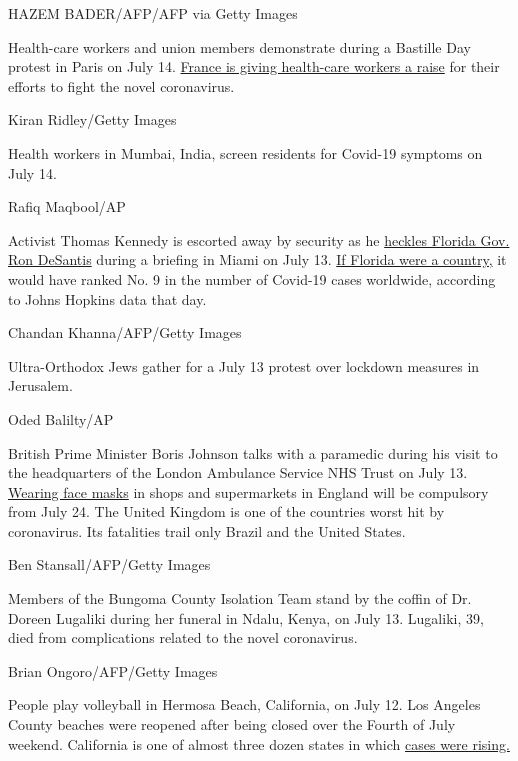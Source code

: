 HAZEM BADER/AFP/AFP via Getty Images

Health-care workers and union members demonstrate during a Bastille Day
protest in Paris on July 14.
\href{https://www.npr.org/sections/coronavirus-live-updates/2020/07/14/890721869/french-health-care-workers-given-a-raise-honored-on-bastille-day}{France
is giving health-care workers a raise} for their efforts to fight the
novel coronavirus.

Kiran Ridley/Getty Images

Health workers in Mumbai, India, screen residents for Covid-19 symptoms
on July 14.

Rafiq Maqbool/AP

Activist Thomas Kennedy is escorted away by security as he
\href{https://edition.cnn.com/videos/politics/2020/07/14/desantis-heckler-coronavirus-press-conference-flores-sot-newday-vpx.cnn}{heckles
Florida Gov. Ron DeSantis} during a briefing in Miami on July 13.
\href{https://www.cnn.com/2020/07/13/health/florida-coronavirus-cases-comparisons/index.html}{If
Florida were a country,} it would have ranked No. 9 in the number of
Covid-19 cases worldwide, according to Johns Hopkins data that day.

Chandan Khanna/AFP/Getty Images

Ultra-Orthodox Jews gather for a July 13 protest over lockdown measures
in Jerusalem.

Oded Balilty/AP

British Prime Minister Boris Johnson talks with a paramedic during his
visit to the headquarters of the London Ambulance Service NHS Trust on
July 13.
\href{https://www.cnn.com/2020/07/14/uk/uk-masks-shops-winter-predictions-intl-scli-gbr/index.html}{Wearing
face masks} in shops and supermarkets in England will be compulsory from
July 24. The United Kingdom is one of the countries worst hit by
coronavirus. Its fatalities trail only Brazil and the United States.

Ben Stansall/AFP/Getty Images

Members of the Bungoma County Isolation Team stand by the coffin of Dr.
Doreen Lugaliki during her funeral in Ndalu, Kenya, on July 13.
Lugaliki, 39, died from complications related to the novel coronavirus.

Brian Ongoro/AFP/Getty Images

People play volleyball in Hermosa Beach, California, on July 12. Los
Angeles County beaches were reopened after being closed over the Fourth
of July weekend. California is one of almost three dozen states in which
\href{https://www.cnn.com/2020/07/13/us/us-coronavirus-monday/index.html}{cases
were rising.}


